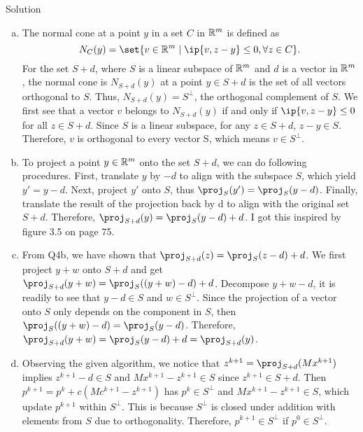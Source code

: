 \documentclass{article}
\begin{document}
\begin{solution}
    {Solution}
    \begin{enumerate}[(a)]
        \item The normal cone at a point $y$ in a set $C$ in $\mathbb{R}^m$ is defined as \[N_C(y)=\set{v\in\R^m \mid \ip{v, z-y}\leq 0, \forall z\in C}.\]
        For the set $S+d$, where $S$ is a linear subspace of $\mathbb{R}^m$ and $d$ is a vector in $\mathbb{R}^m$, the normal cone is $N_{S+d}(y)$ at a point $y\in S+d$ is the set of all vectors orthogonal to $S$. Thus, $N_{S+d}(y)=S^{\bot}$, the orthogonal complement of $S$. We first see that a vector $v$ belongs to $N_{S+d}(y)$ if and only if $\ip{v, z-y}\leq 0$ for all $z\in S+d$. Since $S$ is a linear subspace, for any $z\in S+d$, $z-y\in S$. Therefore, $v$ is orthogonal to every vector S, which means $v\in S^{\bot}$.
        \item To project a point $y\in\mathbb{R}^m$ onto the set $S+d$, we can do following procedures. First, translate $y$ by $-d$ to align with the subspace $S$, which yield $y'=y-d$. Next, project $y'$ onto $S$, thus $\proj_S(y')=\proj_S(y-d)$. Finally, translate the result of the projection back by d to align with the original set $S+d$. Therefore, $\proj_{S+d}(y)=\proj_S(y-d)+d$. I got this inspired by figure 3.5 on page 75.
        \item From Q4b, we have shown that $\proj_{S+d}(z)=\proj_S(z-d)+d$. We first project $y+w$ onto $S+d$ and get $\proj_{S+d}(y+w)=\proj_S((y+w)-d)+d$. Decompose $y+w-d$, it is readily to see that $y-d\in S$ and $w\in S^{\bot}$. Since the projection of a vector onto $S$ only depends on the component in $S$, then $\proj_S((y+w)-d)=\proj_S(y-d)$. Therefore, $\proj_{S+d}(y+w)=\proj_S(y-d)+d=\proj_{S+d}(y)$.
        \item Observing the given algorithm, we notice that $z^{k+1}=\proj_{S+d}(Mx^{k+1})$ implies $z^{k+1}-d\in S$ and $Mx^{k+1}-z^{k+1}\in S$ since $z^{k+1} \in S+d$. Then $p^{k+1}=p^k+c(Mc^{k+1}-z^{k+1})$ has $p^k\in S^{\bot}$ and $Mx^{k+1}-z^{k+1}\in S$, which update $p^{k+1}$ within $S^{\bot}$. This is because $S^{\bot}$ is closed under addition with elements from $S$ due to orthogonality. Therefore, $p^{k+1}\in S^{\bot}$ if $p^0\in S^{\bot}$.
    \end{enumerate}
\end{solution}
\end{document}
